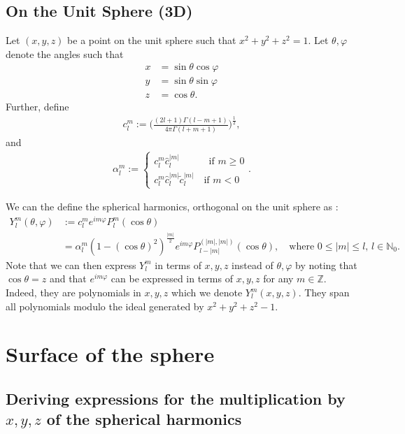 \documentclass[11pt, oneside]{article}   	%
\newcommand{\No}{\mathbb{N}_0}
\newcommand{\Ylm}{Y^m_l}
\newcommand{\Ylmfull}{Y^m_l(\theta,\varphi)}
\newcommand{\Plm}{P^m_l}
\newcommand{\costheta}{\cos\theta}
\newcommand{\sintheta}{\sin\theta}
\newcommand{\cosphi}{\cos\varphi}
\newcommand{\sinphi}{\sin\varphi}
\newcommand{\eimphi}{e^{im\varphi}}
\newcommand{\alphalm}{\alpha^m_l}
\newcommand{\clm}{c^m_l}
\newcommand{\ctildemod}{\tilde{c}^{|m|}_l}
\newcommand{\chatmod}{\hat{c}^{|m|}_l}
\begin{document}
\subsection{On the Unit Sphere (3D)}

Let \((x,y,z)\) be a point on the unit sphere such that \(x^2+y^2+z^2 = 1\). Let \(\theta, \varphi\) denote the angles such that
\begin{align}
x &= \sintheta \cosphi \\
y &= \sintheta \sinphi \\
z &= \costheta.
\end{align}
Further, define
\begin{align}
\clm := \Bigg(\frac{(2l+1)\Gamma(l-m+1)}{4\pi\Gamma(l+m+1)}\Bigg)^\frac{1}{2},
\end{align}
and
\begin{align}
\alphalm := \begin{cases} 
		\clm \chatmod \quad \quad \quad \text{if } m \ge 0 \\
		\clm \chatmod \ctildemod \quad \text{if } m < 0
	   \end{cases}.
\end{align}

We can the define the spherical harmonics, orthogonal on the unit sphere as \cite{DLMFSphericalandSpheroidalHarmonics, DLMFFerrers, DLMFAssociatedLegendre}:
\begin{align}
\Ylmfull &:= \clm \eimphi \Plm (\costheta) \\
&= \alphalm (1 - (\costheta)^2)^\frac{|m|}{2} \eimphi P^{(|m|,|m|)}_{l-|m|}(\costheta), \quad \text{where } 0 \le |m| \le l, \, l \in \No.
\end{align} 
Note that we can then express \(\Ylm\) in terms of \(x,y,z\) instead of \(\theta, \varphi\) by noting that \(\costheta = z\) and that \( \eimphi\) can be expressed in terms of \(x,y,z\) for any \(m\in\mathbb{Z}\). Indeed, they are polynomials in $x,y,z$ which we denote $\Ylm(x,y,z)$. They span all polynomials modulo the ideal generated by $x^2 + y^2 + z^2 - 1$.



\section{Surface of the sphere}

\subsection{Deriving expressions for the multiplication by \(x, y, z\) of the spherical harmonics}
\end{document}
